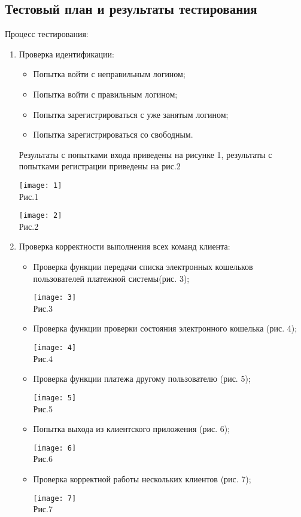 \documentclass[12pt,a4paper]{report}
\begin{document}
\subsection{Тестовый план и результаты тестирования}
\label{testing_tcp}
Процесс тестирования:
	\begin{enumerate}
	\item Проверка идентификации:
		\begin{itemize}
		\item Попытка войти с неправильным логином;
		\item Попытка войти с правильным логином;
		\item Попытка зарегистрироваться с уже занятым логином;
		\item Попытка зарегистрироваться со свободным.
		\end{itemize}
Результаты с попытками входа приведены на рисунке 1, результаты с попытками регистрации приведены на рис.2 
\begin{center}
\texttt{[image: 1]}\\
Рис.1\\
\end{center}
\begin{center}
\texttt{[image: 2]}\\
Рис.2\\
\end{center}
\item Проверка корректности выполнения всех команд клиента:
		\begin{itemize}
		\item Проверка функции передачи списка электронных кошельков
пользователей платежной системы(рис. 3);
\begin{center}
\texttt{[image: 3]}\\
Рис.3\\
\end{center}
		\item Проверка функции проверки состояния электронного кошелька (рис. 4);
\begin{center}
\texttt{[image: 4]}\\
Рис.4\\
\end{center}
		\item Проверка функции платежа другому пользователю (рис. 5);
\begin{center}
\texttt{[image: 5]}\\
Рис.5\\
\end{center}
		\item Попытка выхода из клиентского приложения (рис. 6);
\begin{center}
\texttt{[image: 6]}\\
Рис.6\\
\end{center}
		\item Проверка корректной работы нескольких клиентов (рис. 7);
\begin{center}
\texttt{[image: 7]}\\
Рис.7\\
\end{center}


\end{itemize}
\end{enumerate}
\end{document}

